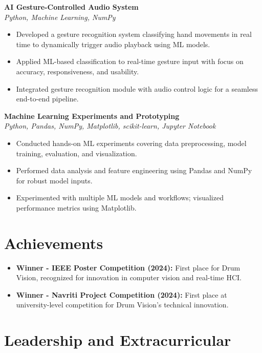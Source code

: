 \documentclass[10pt,a4paper]{article}
\begin{document}
\textbf{AI Gesture-Controlled Audio System} \\
\textit{Python, Machine Learning, NumPy}
\begin{itemize}
    \item Developed a gesture recognition system classifying hand movements in real time to dynamically trigger audio playback using ML models.
    \item Applied ML-based classification to real-time gesture input with focus on accuracy, responsiveness, and usability.
    \item Integrated gesture recognition module with audio control logic for a seamless end-to-end pipeline.
\end{itemize}

\textbf{Machine Learning Experiments and Prototyping} \\
\textit{Python, Pandas, NumPy, Matplotlib, scikit-learn, Jupyter Notebook}
\begin{itemize}
    \item Conducted hands-on ML experiments covering data preprocessing, model training, evaluation, and visualization.
    \item Performed data analysis and feature engineering using Pandas and NumPy for robust model inputs.
    \item Experimented with multiple ML models and workflows; visualized performance metrics using Matplotlib.
\end{itemize}

\section*{Achievements}
\begin{itemize}
    \item \textbf{Winner - IEEE Poster Competition (2024):} First place for Drum Vision, recognized for innovation in computer vision and real-time HCI.
    \item \textbf{Winner - Navriti Project Competition (2024):} First place at university-level competition for Drum Vision's technical innovation.
\end{itemize}

\section*{Leadership and Extracurricular}
\end{document}
